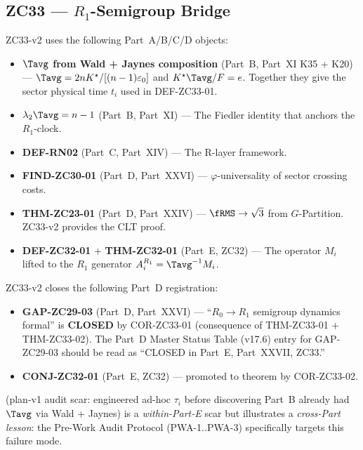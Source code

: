 \documentclass[12pt, a4paper]{article}
\begin{document}
\subsection{ZC33 --- $R_1$-Semigroup Bridge}
\label{cmap:zc33}

\begin{inheritbox}
ZC33-v2 uses the following Part~A/B/C/D objects:
\begin{itemize}[noitemsep,leftmargin=1.5em]
  \item \textbf{$\Tavg$ from Wald + Jaynes composition} (Part~B,
    Part~XI K35 + K20) ---
    $\Tavg = 2nK^\star/[(n-1)\varepsilon_0]$ and
    $K^\star\Tavg/F = e$.
    Together they give the sector physical time $t_i$ used in
    DEF-ZC33-01.
  \item \textbf{$\lambda_2\Tavg = n-1$} (Part~B, Part~XI) ---
    The Fiedler identity that anchors the $R_1$-clock.
  \item \textbf{DEF-RN02} (Part~C, Part~XIV) ---
    The R-layer framework.
  \item \textbf{FIND-ZC30-01} (Part~D, Part~XXVI) ---
    $\varphi$-universality of sector crossing costs.
  \item \textbf{THM-ZC23-01} (Part~D, Part~XXIV) ---
    $\fRMS \to \sqrt{3}$ from $G$-Partition. ZC33-v2 provides the
    CLT proof.
  \item \textbf{DEF-ZC32-01} + \textbf{THM-ZC32-01} (Part~E, ZC32)
    --- The operator $M_i$ lifted to the $R_1$ generator
    $A_i^{R_1} = \Tavg^{-1} M_i$.
\end{itemize}
\end{inheritbox}

\begin{correctionbox}
ZC33-v2 closes the following Part~D registration:
\begin{itemize}[noitemsep,leftmargin=1.5em]
  \item \textbf{GAP-ZC29-03} (Part~D, Part~XXVI) ---
    ``$R_0 \to R_1$ semigroup dynamics formal'' is \textbf{CLOSED}
    by COR-ZC33-01 (consequence of THM-ZC33-01 + THM-ZC33-02).
    The Part~D Master Status Table (v17.6) entry for GAP-ZC29-03
    should be read as ``CLOSED in Part~E, Part~XXVII, ZC33.''
  \item \textbf{CONJ-ZC32-01} (Part~E, ZC32) ---
    promoted to theorem by COR-ZC33-02.
\end{itemize}
\end{correctionbox}

\noindent {} (plan-v1 audit scar: engineered ad-hoc
$\tau_i$ before discovering Part~B already had $\Tavg$ via
Wald + Jaynes) is a \emph{within-Part-E} scar but illustrates a
\emph{cross-Part lesson}: the Pre-Work Audit Protocol (PWA-1..PWA-3)
specifically targets this failure mode.
\end{document}
